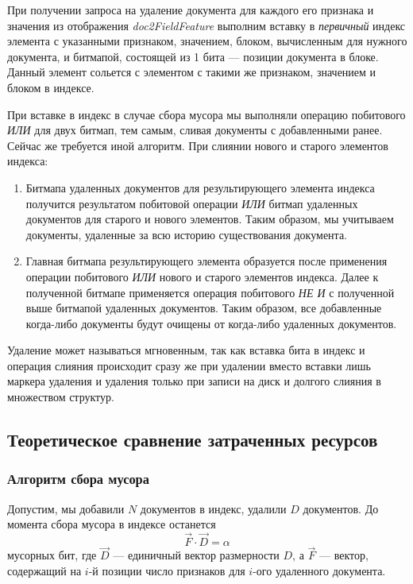 При получении запроса на удаление документа для каждого его признака и
значения из отображения \textit{doc2FieldFeature} выполним вставку в
\textit{первичный} индекс элемента с указанными признаком, значением, блоком,
вычисленным для нужного документа, и битмапой, состоящей из 1 бита — позиции
документа в блоке. Данный элемент сольется с элементом с такими же признаком,
значением и блоком в индексе.

При вставке в индекс в случае сбора мусора мы выполняли операцию побитового
\textit{ИЛИ} для двух битмап, тем самым, сливая документы с добавленными ранее.
Сейчас же требуется иной алгоритм. При слиянии нового и старого элементов
индекса:
\begin{enumerate}
    \item Битмапа удаленных документов для результирующего элемента индекса
    получится результатом побитовой операции \textit{ИЛИ} битмап удаленных
    документов для старого и нового элементов. Таким образом, мы учитываем
    документы, удаленные за всю историю существования документа.
    \item Главная битмапа результирующего элемента образуется после применения
    операции побитового \textit{ИЛИ} нового и старого элементов индекса. Далее к 
    полученной битмапе применяется операция побитового \textit{НЕ И} с полученной
    выше битмапой удаленных документов. Таким образом, все добавленные когда-либо
    документы будут очищены от когда-либо удаленных документов. 
\end{enumerate}

Удаление может называться мгновенным, так как вставка бита в индекс и операция
слияния происходит сразу же при удалении вместо вставки лишь маркера удаления и
удаления только при записи на диск и долгого слияния в множеством структур.

\subsection{Теоретическое сравнение затраченных ресурсов}
\label{theory}
\subsubsection{Алгоритм сбора мусора}

Допустим, мы добавили $N$ документов в индекс, удалили $D$ документов.
До момента сбора мусора в индексе останется
\begin{equation}
    \label{alpha}
    \vec{F} \cdot \vec{D} = \alpha
\end{equation}
мусорных бит, где $\vec{D}$ — единичный вектор размерности $D$, 
а $\vec{F}$ — вектор, содержащий на $i$-й позиции число признаков для $i$-ого удаленного документа.

